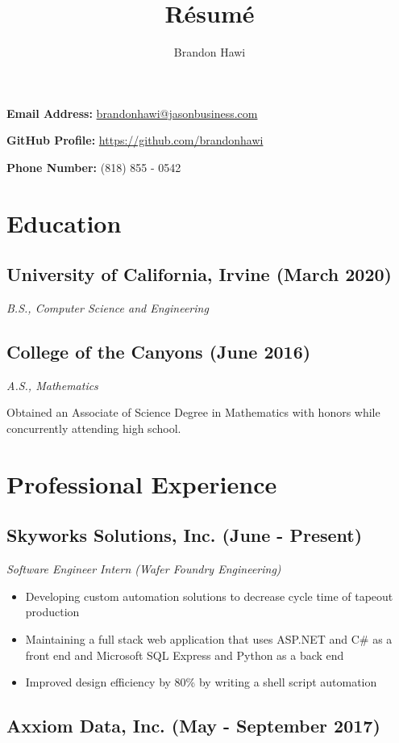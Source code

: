 \documentclass[10pt]{article}
\makeatletter
\renewcommand{\maketitle}
{
\huge
\noindent\textbf{\theauthor} \hfill \small{ \textbf{Email Address: }\href{mailto:brandonhawi@jasonbusiness.com}{brandonhawi@jasonbusiness.com}

\hfill \textbf{GitHub Profile: }\href{https://github.com/brandonhawi}{https://github.com/brandonhawi}

\hfill \textbf{Phone Number: }(818) 855 - 0542}}
\makeatother
\begin{document}
\title{R\'esum\'e}
\author{Brandon Hawi}

\maketitle
\vspace{-0.1in}
\section{Education}

\subsection{University of California, Irvine (March 2020)}
\noindent\textit{B.S., Computer Science and Engineering}

\subsection{College of the Canyons (June 2016)}
\noindent\textit{A.S., Mathematics}

Obtained an Associate of Science Degree in Mathematics with honors while concurrently attending
high school.

\section{Professional Experience}

\subsection{Skyworks Solutions, Inc. (June - Present)}

\noindent\textit{Software Engineer Intern (Wafer Foundry Engineering)}

\begin{itemize}
	\setlength\itemsep{0em}
	\item Developing custom automation solutions to decrease cycle time of tapeout production
	\item Maintaining a full stack web application that uses ASP.NET and C\# as a front end and Microsoft SQL Express and Python as a back end
	\item Improved design efficiency by 80\% by writing a shell script automation
\end{itemize}

\subsection{Axxiom Data, Inc. (May - September 2017)}
\end{document}
